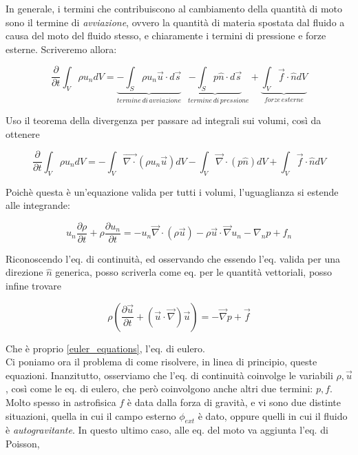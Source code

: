\documentclass{report}
\begin{document}
In generale, i termini che contribuiscono al cambiamento della quantità di moto sono il termine di \emph{avviazione}, ovvero la quantità di materia spostata dal fluido a causa del moto del fluido stesso, e chiaramente i termini di pressione e forze esterne. Scriveremo allora: 

\begin{equation}
    \frac{\partial}{\partial t}\int_V \rho u_n dV = \underbrace{-\int_S\rho u_n \vec{u}\cdot d\vec{s}}_{termine \, di \, avviazione} \underbrace{- \int_S p\hat{n} \cdot d\vec{s}}_{\quad termine \, di \, pressione} + \underbrace{\int_V \vec{f}\cdot \hat{n}dV}_{forze \, esterne}
\end{equation}

Uso il teorema della divergenza per passare ad integrali sui volumi, così da ottenere

\begin{equation}
    \frac{\partial}{\partial t}\int_V \rho u_n dV = -\int_V \vec{\nabla \cdot }(\rho u_n \vec{u}) dV - \int_V \vec{\nabla} \cdot (p\hat{n}) dV + \int_V \vec{f}\cdot \hat{n}dV
\end{equation}

Poichè questa è un'equazione valida per tutti i volumi, l'uguaglianza si estende alle integrande: 

\begin{equation}
    u_n \frac{\partial \rho }{\partial t} + \rho \frac{\partial u_n}{\partial t} = -u_n \vec{\nabla}\cdot (\rho\vec{u}) - \rho \vec{u}\cdot \vec{\nabla}u_n - \nabla_np + f_n
\end{equation}

Riconoscendo l'eq. di continuità, ed osservando che essendo l'eq. valida per una direzione $\hat{n}$ generica, posso scriverla come eq. per le quantità vettoriali, posso infine trovare 

\begin{equation}
    \rho \left(\frac{\partial \vec{u}}{\partial t} + (\vec{u}\cdot \vec{\nabla})\vec{u}\right) = -\vec{\nabla}p + \vec{f}
\end{equation}

Che è proprio \ref{euler_equations}, l'eq. di eulero. \\

Ci poniamo ora il problema di come risolvere, in linea di principio, queste equazioni. Inanzitutto, osserviamo che l'eq. di continuità coinvolge le variabili $\rho, \vec{u}$, così come le eq. di eulero, che però coinvolgono anche altri due termini: $p, f$. Molto spesso in astrofisica $f$ è data dalla forza di gravità, e vi sono due distinte situazioni, quella in cui il campo esterno $\phi_{ext}$ è dato, oppure quelli in cui il fluido è \emph{autogravitante}. In questo ultimo caso, alle eq. del moto va aggiunta l'eq. di Poisson, 
\end{document}
